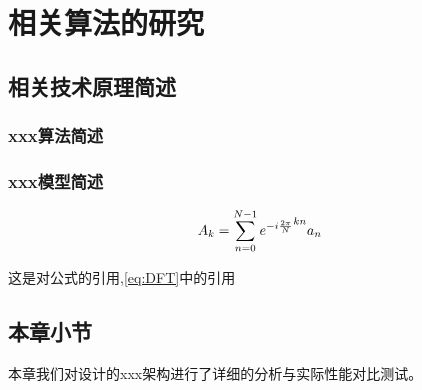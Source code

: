\chapter {相关算法的研究}


\section {相关技术原理简述}


\subsection {xxx算法简述}\label{section:acoustic-feat}

\subsection {xxx模型简述}



\begin{equation}
\label{eq:DFT}
A_k = \sum_{n=0}^{N-1} {e^{-i {2 \pi \over N}}}^{kn} a_n 
\end{equation}


这是对公式的引用,\autoref{eq:DFT}中的引用

\section{本章小节}

本章我们对设计的xxx架构进行了详细的分析与实际性能对比测试。